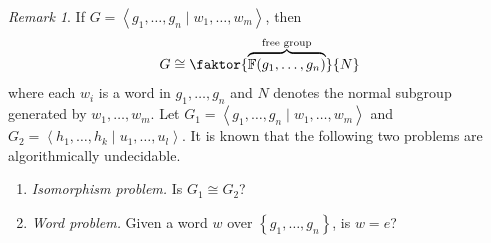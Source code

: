 \documentclass[10pt,letterpaper,cm]{nupset}
\theoremstyle{definition}
\theoremstyle{theorem}
\theoremstyle{remark}
\newtheorem{remark}[definition]{Remark}
\newcommand{\F}{\mathbb F}
\newcommand{\1}{\mathbb{1}}
\newcommand{\0}{\vec 0}
\begin{document}
\begin{remark} If $G = \left\langle g_1, \ldots, g_n \mid w_1, \ldots, w_m \right\rangle$, then $$G \cong \faktor{\overbrace{\F(g_1, \ldots, g_n)}^{\text{free group}}}{N}$$ where  each $w_i$ is a word in $g_1, \ldots, g_n$ and $N$ denotes the normal subgroup generated by $w_1, \ldots, w_m$.
Let $G_1 = \left\langle g_1, \ldots, g_n \mid w_1, \ldots, w_m \right\rangle$ and $G_2 = \left\langle h_1, \ldots, h_k \mid u_1, \ldots, u_l \right\rangle$.
It is known that the following two problems are algorithmically undecidable.
\begin{enumerate}[label=(\alph*)]
\item{\textit{Isomorphism problem.}} Is $G_1 \cong G_2$?
\item {\textit{Word problem.}} Given a word $w$ over $\left\{g_1, \ldots, g_n\right\}$, is $w=e$? 
\end{enumerate}
\end{remark}

\bigskip
\end{document}
